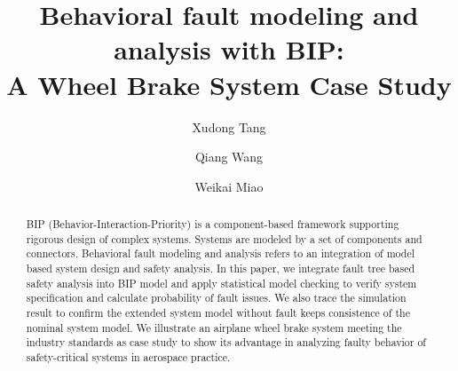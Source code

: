 \documentclass[runningheads]{llncs}
\begin{document}
%
\title{Behavioral fault modeling and analysis with BIP:\\
	A Wheel Brake System Case Study\\}
%
%
\author{Xudong Tang \and
Qiang Wang \and
Weikai Miao}
%
%
%
\maketitle              %
%
\begin{abstract}
BIP (Behavior-Interaction-Priority) is a component-based framework supporting rigorous design of complex systems.
Systems are modeled by a set of components and connectors.
Behavioral fault modeling and analysis refers to an integration of model based system design and safety analysis.
In this paper, we integrate fault tree based safety analysis into BIP model and
apply statistical model checking to verify system specification and calculate probability of fault issues.
We also trace the simulation result to confirm the extended system model without fault keeps consistence of the nominal system model.
We illustrate an airplane wheel brake system meeting the industry standards as case study
to show its advantage in analyzing faulty behavior of safety-critical systems in aerospace practice.

\end{abstract}
%
%
%







\end{document}
